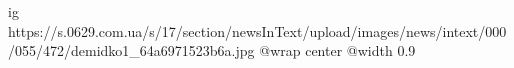  
 
 
 
 

\ifcmt
  ig https://s.0629.com.ua/s/17/section/newsInText/upload/images/news/intext/000/055/472/demidko1_64a6971523b6a.jpg
  @wrap center
  @width 0.9
\fi
